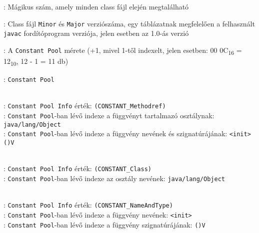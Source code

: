 \begin{compactitem}
\setlength\itemsep{-5px}
\item {}: Mágikus szám, amely minden class fájl elején megtalálható
\item {} : Class fájl \lstinline{Minor} és \lstinline{Major} verziószáma, egy táblázatnak megfelelően a felhasznált \lstinline{javac} fordítóprogram verziója, jelen esetben az 1.0-ás verzió
\item {}: A \lstinline{Constant Pool} mérete (+1, mivel 1-től indexelt, jelen esetben: 00 0C\textsubscript{16} = 12\textsubscript{10}, 12 - 1 = 11 db)
\item {}: \lstinline{Constant Pool}
\begin{compactitem}
    \setlength\itemsep{-5px}
    \item {}   \\
    : \lstinline{Constant Pool Info} érték: \lstinline{(CONSTANT_Methodref)} \\
    : \lstinline{Constant Pool}-ban lévő indexe a függvényt tartalmazó osztálynak: \lstinline{java/lang/Object} \\
    : \lstinline{Constant Pool}-ban lévő indexe a függvény nevének és szignatúrájának: \lstinline{<init> ()V}
    \item {}  \\
    : \lstinline{Constant Pool Info} érték: \lstinline{(CONSTANT_Class)} \\
    : \lstinline{Constant Pool}-ban lévő indexe az osztály nevének: \lstinline{java/lang/Object}
    \item {}   \\
    : \lstinline{Constant Pool Info} érték: \lstinline{(CONSTANT_NameAndType)} \\
    : \lstinline{Constant Pool}-ban lévő indexe a függvény nevének: \lstinline{<init>} \\
    : \lstinline{Constant Pool}-ban lévő indexe a függvény szignatúrájának: \lstinline{()V}

\end{compactitem}
\end{compactitem}
